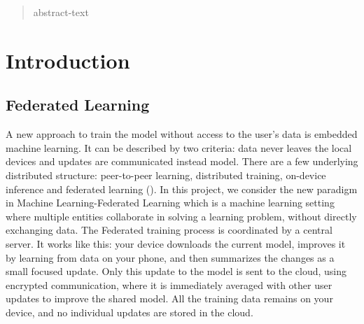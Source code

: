 \documentclass{article}
\theoremstyle{theorem}
\theoremstyle{definition}
\begin{document}
	\author{Hoang Trung Hieu
	}                      
	\date{2020}
	\maketitle
	
	\noindent
	\begin{abstract}
		abstract-text
	\end{abstract}
	\section{Introduction}
	\subsection{Federated Learning}
	A new approach to train the model without access to the user's data is embedded machine learning. It can be described by two criteria: data never leaves the local devices and updates are communicated instead model. There are a few underlying distributed structure: peer-to-peer learning, distributed training, on-device inference and federated learning (\cite{cite1}). In this project, we consider the new paradigm in Machine Learning-Federated Learning which is a machine learning setting where multiple entities collaborate in solving a learning problem, without directly exchanging data. The Federated training process is coordinated by a central server. It works like this: your device downloads the current model, improves it by learning from data on your phone, and then summarizes the changes as a small focused update. Only this update to the model is sent to the cloud, using encrypted communication, where it is immediately averaged with other user updates to improve the shared model. All the training data remains on your device, and no individual updates are stored in the cloud.\\
\end{document}
